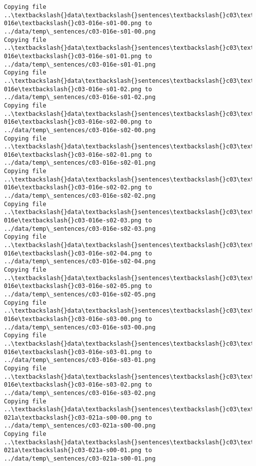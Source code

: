 \documentclass[11pt]{article}
\begin{document}
\begin{Verbatim}[commandchars=\\\{\}]
Copying file ..\textbackslash{}data\textbackslash{}sentences\textbackslash{}c03\textbackslash{}c03-016e\textbackslash{}c03-016e-s01-00.png to
../data/temp\_sentences/c03-016e-s01-00.png
Copying file ..\textbackslash{}data\textbackslash{}sentences\textbackslash{}c03\textbackslash{}c03-016e\textbackslash{}c03-016e-s01-01.png to
../data/temp\_sentences/c03-016e-s01-01.png
Copying file ..\textbackslash{}data\textbackslash{}sentences\textbackslash{}c03\textbackslash{}c03-016e\textbackslash{}c03-016e-s01-02.png to
../data/temp\_sentences/c03-016e-s01-02.png
Copying file ..\textbackslash{}data\textbackslash{}sentences\textbackslash{}c03\textbackslash{}c03-016e\textbackslash{}c03-016e-s02-00.png to
../data/temp\_sentences/c03-016e-s02-00.png
Copying file ..\textbackslash{}data\textbackslash{}sentences\textbackslash{}c03\textbackslash{}c03-016e\textbackslash{}c03-016e-s02-01.png to
../data/temp\_sentences/c03-016e-s02-01.png
Copying file ..\textbackslash{}data\textbackslash{}sentences\textbackslash{}c03\textbackslash{}c03-016e\textbackslash{}c03-016e-s02-02.png to
../data/temp\_sentences/c03-016e-s02-02.png
Copying file ..\textbackslash{}data\textbackslash{}sentences\textbackslash{}c03\textbackslash{}c03-016e\textbackslash{}c03-016e-s02-03.png to
../data/temp\_sentences/c03-016e-s02-03.png
Copying file ..\textbackslash{}data\textbackslash{}sentences\textbackslash{}c03\textbackslash{}c03-016e\textbackslash{}c03-016e-s02-04.png to
../data/temp\_sentences/c03-016e-s02-04.png
Copying file ..\textbackslash{}data\textbackslash{}sentences\textbackslash{}c03\textbackslash{}c03-016e\textbackslash{}c03-016e-s02-05.png to
../data/temp\_sentences/c03-016e-s02-05.png
Copying file ..\textbackslash{}data\textbackslash{}sentences\textbackslash{}c03\textbackslash{}c03-016e\textbackslash{}c03-016e-s03-00.png to
../data/temp\_sentences/c03-016e-s03-00.png
Copying file ..\textbackslash{}data\textbackslash{}sentences\textbackslash{}c03\textbackslash{}c03-016e\textbackslash{}c03-016e-s03-01.png to
../data/temp\_sentences/c03-016e-s03-01.png
Copying file ..\textbackslash{}data\textbackslash{}sentences\textbackslash{}c03\textbackslash{}c03-016e\textbackslash{}c03-016e-s03-02.png to
../data/temp\_sentences/c03-016e-s03-02.png
Copying file ..\textbackslash{}data\textbackslash{}sentences\textbackslash{}c03\textbackslash{}c03-021a\textbackslash{}c03-021a-s00-00.png to
../data/temp\_sentences/c03-021a-s00-00.png
Copying file ..\textbackslash{}data\textbackslash{}sentences\textbackslash{}c03\textbackslash{}c03-021a\textbackslash{}c03-021a-s00-01.png to
../data/temp\_sentences/c03-021a-s00-01.png

\end{Verbatim}
\end{document}
